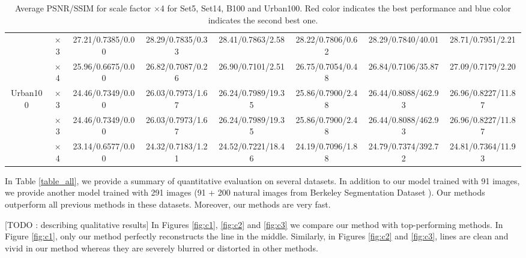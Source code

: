 \documentclass[10pt,twocolumn,letterpaper]{article}
\begin{document}
\begin{table}
\begin{center}
\begin{tabular}{ | c | c | c | c | c | c | c | c | }
 & $\times$3 & 27.21/0.7385/0.00 & 28.29/0.7835/0.33 & {\color{blue}28.41}/{\color{blue}0.7863}/2.58 & 28.22/0.7806/0.62 & 28.29/0.7840/40.01 & {\color{red}28.71}/{\color{red}0.7951}/2.21\\
 & $\times$4 & 25.96/0.6675/0.00 & 26.82/0.7087/0.26 & {\color{blue}26.90}/0.7101/2.51 & 26.75/0.7054/0.48 & 26.84/{\color{blue}0.7106}/35.87 & {\color{red}27.09}/{\color{red}0.7179}/2.20\\
\hline
\hline
\multirow{3}{*}{Urban100} & $\times$3 & 24.46/0.7349/0.00 & 26.03/0.7973/1.67 & 26.24/0.7989/19.35 & 25.86/0.7900/2.48 & {\color{blue}26.44}/{\color{blue}0.8088}/462.93 & {\color{red}26.96}/{\color{red}0.8227}/11.87\\
 & $\times$3 & 24.46/0.7349/0.00 & 26.03/0.7973/1.67 & 26.24/0.7989/19.35 & 25.86/0.7900/2.48 & {\color{blue}26.44}/{\color{blue}0.8088}/462.93 & {\color{red}26.96}/{\color{red}0.8227}/11.87\\
 & $\times$4 & 23.14/0.6577/0.00 & 24.32/0.7183/1.21 & 24.52/0.7221/18.46 & 24.19/0.7096/1.88 & {\color{blue}24.79}/{\color{red}0.7374}/392.72 & {\color{red}24.81}/{\color{blue}0.7364}/11.93\\
\hline
\end{tabular}
\caption{Average PSNR/SSIM for scale factor $\times$4 for Set5, Set14, B100 and Urban100. {\color{red}Red color} indicates the best performance and {\color{blue}blue color} indicates the second best one.}
\end{center}
\end{table}

In Table \ref{table_all}, we provide a summary of quantitative evaluation on several datasets. In addition to our model trained with 91 images, we provide another model trained with 291 images (91 + 200 natural images from Berkeley Segmentation Dataset \cite{Martin2001}).
Our methods outperform all previous methods in these datasets. Moreover, our methods are very fast.

[TODO : describing qualitative results]
In Figures \ref{fig:c1}, \ref{fig:c2} and \ref{fig:c3} we compare our method with top-performing methods. In Figure \ref{fig:c1}, only our method perfectly reconstructs the line in the middle. Similarly, in Figures \ref{fig:c2} and \ref{fig:c3}, lines are clean and vivid in our method whereas they are severely blurred or distorted in other methods.
\end{document}
